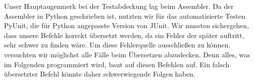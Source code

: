 Unser Hauptaugenmerk bei der Testabdeckung lag beim Assembler. Da der Assembler in Python geschrieben ist, nutzten wir  für das automatisierte Testen PyUnit, die für Python angepasste Version von JUnit.
Wir mussten sichergehen, dass unsere Befehle korrekt übersetzt werden, da ein Fehler der später auftritt, sehr schwer zu finden wäre. Um diese Fehlerquelle ausschließen zu können, versuchten wir möglichst alle Fälle beim Übersetzen abzudecken. Denn alles, was im Folgenden programmiert wird, baut auf diesen Befehlen auf. Ein falsch übersetzter Befehl könnte daher schwerwiegende Folgen haben. 
